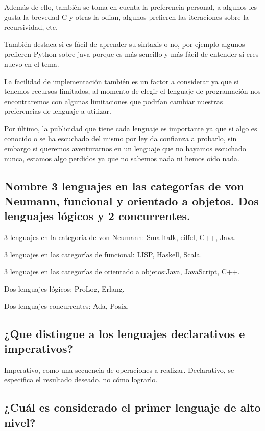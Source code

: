 Además de ello, también se toma en cuenta la preferencia personal, a algunos les gusta la brevedad C y otras la odian, algunos prefieren las iteraciones sobre la recursividad, etc.

También destaca si es fácil de aprender su sintaxis o no, por ejemplo algunos prefieren Python sobre java porque es más sencillo y más fácil de entender si eres nuevo en el tema.

La facilidad de implementación también es un factor a considerar ya que si tenemos recursos limitados, al momento de elegir el lenguaje de programación nos encontraremos con algunas limitaciones que podrían cambiar nuestras preferencias de lenguaje a utilizar.

Por último, la publicidad que tiene cada lenguaje es importante ya que si algo es conocido o se ha escuchado del mismo por ley da confianza a probarlo, sin embargo si queremos aventurarnos en un lenguaje que no hayamos escuchado nunca, estamos algo perdidos ya que no sabemos nada ni hemos oído nada.



\subsection{Nombre 3 lenguajes en las categorías de von Neumann, funcional y orientado a objetos. Dos lenguajes lógicos y 2 concurrentes.}

3 lenguajes en la categoría de von Neumann: Smalltalk, eiffel, C++, Java.

 3 lenguajes en las categorías de funcional: LISP, Haskell, Scala.
 
3 lenguajes en las categorías de orientado a objetos:Java, JavaScript, C++.

Dos lenguajes lógicos: ProLog, Erlang.

Dos lenguajes concurrentes: Ada, Posix.


\subsection{¿Que distingue a los lenguajes declarativos e imperativos?}

Imperativo, como una secuencia de operaciones a realizar. Declarativo, se especifica el resultado deseado, no cómo lograrlo.


\subsection{¿Cuál es considerado el primer lenguaje de alto nivel? }

